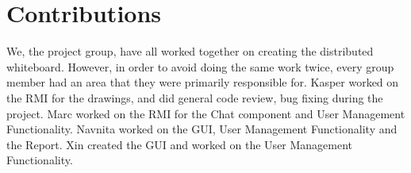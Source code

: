 \chapter{Contributions}
We, the project group, have all worked together on creating the distributed whiteboard. However, in order to avoid doing the same work twice, every group member had an area that they were primarily responsible for. Kasper worked on the RMI for the drawings, and did general code review, bug fixing during the project. Marc worked on the RMI for the Chat component and User Management Functionality. Navnita worked on the GUI, User Management Functionality and the Report. Xin created the GUI and worked on the User Management Functionality.
